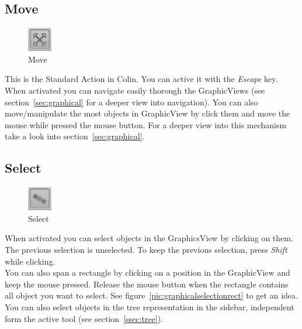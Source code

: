 \documentclass[a4paper,11pt]{report}
\begin{document}
\subsection{Move}
\label{ssec:toolmove}
\begin{minipage}[h]{4cm}
\begin{figure}[H]
\begin{center}
\includegraphics[scale=0.6]{../pictures/movetoolbar.png}
\caption{Move}
\label{pic:movetoolbar}
\end{center}
\end{figure}
\end{minipage}
\begin{minipage}[h]{\textwidth-4cm}
This is the Standard Action in Colin. You can active it with the \textit{Escape} key. When activated you can navigate easily thorough the GraphicViews (see section~\ref{sec:graphical} for a deeper view into navigation). 
You can also move/manipulate the most objects in GraphicView by click them and move the mouse while pressed the mouse button. For a deeper view into this mechanism take a look into section~\ref{sec:graphical}.
\end{minipage}

\subsection{Select}

\begin{minipage}[h]{4cm}
\begin{figure}[H]
\begin{center}
\includegraphics[scale=0.6]{../pictures/selecttoolbar.png}
\caption{Select}
\label{pic:selecttoolbar}
\end{center}
\end{figure}
\end{minipage}
\begin{minipage}[h]{\textwidth-4cm}
When activated you can select objects in the GraphicsView by clicking on them. The previous selection is unselected. To keep the previous selection, press \textit{Shift} while clicking.\\
You can also span a rectangle by clicking on a position in the GraphicView and keep the mouse pressed. Release the mouse button when the rectangle contains all object you want to select. See figure~\ref{pic:graphicalselectionrect} to get an idea. You can also select objects in the tree representation in the sidebar, independent form the active tool (see section~\ref{ssec:tree}).
\end{minipage}
\end{document}
